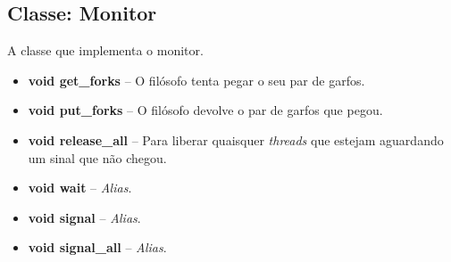 \documentclass[11pt]{article}
\begin{document}
\subsection{Classe: Monitor}
A classe que implementa o monitor. 
\begin{itemize}
	\item \textbf{\textcolor{sblue}{void} get\_forks} -- O filósofo tenta pegar o seu par de garfos.
	\item \textbf{\textcolor{sblue}{void} put\_forks} -- O filósofo devolve o par de garfos que pegou.
	\item \textbf{\textcolor{sblue}{void} release\_all} -- Para liberar quaisquer \textit{threads} que estejam aguardando um sinal que não chegou.
	\item \textbf{\textcolor{sblue}{void} wait} -- \textit{Alias}.
	\item \textbf{\textcolor{sblue}{void} signal} -- \textit{Alias}.
	\item \textbf{\textcolor{sblue}{void} signal\_all} -- \textit{Alias}.
\end{itemize}
\end{document}
